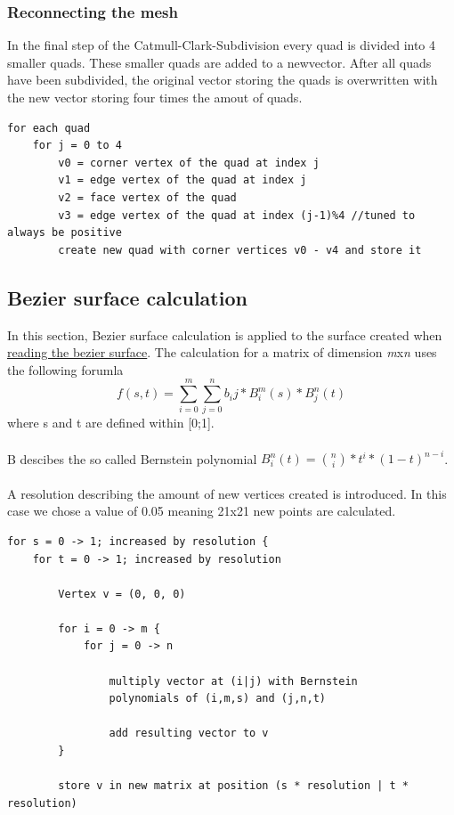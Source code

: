 \documentclass[12pt,a4paper]{scrartcl}
\begin{document}
\subsubsection{Reconnecting the mesh}
In the final step of the Catmull-Clark-Subdivision every quad is divided into 4 smaller quads. These smaller quads are added to a newvector. After all quads have been subdivided, the original vector storing the quads is overwritten with the new vector storing four times the amout of quads.
\begin{lstlisting}[language=PSEUDO]
for each quad
	for j = 0 to 4
		v0 = corner vertex of the quad at index j
		v1 = edge vertex of the quad at index j
		v2 = face vertex of the quad
		v3 = edge vertex of the quad at index (j-1)%4 //tuned to always be positive
		create new quad with corner vertices v0 - v4 and store it
\end{lstlisting}

\subsection{Bezier surface calculation}
In this section, Bezier surface calculation is applied to the surface created when 
\hyperref[read-bezier]{reading the bezier surface}. The calculation for a matrix of dimension 
\textit{m}x\textit{n} uses the following forumla
$$f(s,t) = \sum_{i=0}^{m} \sum_{j=0}^{n} b_ij*B_i^m(s)*B_j^n(t)$$
where s and t are defined within [0;1]. \\
\ \\
B descibes the so called Bernstein polynomial $B_i^n(t) = {n \choose i}*t^i*(1-t)^{n-i}$. \\
\ \\
A resolution describing the amount of new vertices created is introduced. In this case we chose a value of 0.05 meaning 21x21 new points are calculated.
\begin{lstlisting}[language=PSEUDO]
for s = 0 -> 1; increased by resolution {
	for t = 0 -> 1; increased by resolution 
	
		Vertex v = (0, 0, 0)
	
		for i = 0 -> m {
			for j = 0 -> n 
				
				multiply vector at (i|j) with Bernstein 
				polynomials of (i,m,s) and (j,n,t)
					
				add resulting vector to v
		}
		
		store v in new matrix at position (s * resolution | t * resolution)
\end{lstlisting}
\end{document}
